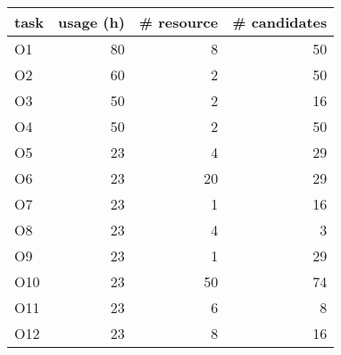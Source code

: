 \begin{tabular}{lrrr}
\toprule
task &  usage (h) &  \# resource &  \# candidates \\
\midrule
  O1 &         80 &           8 &            50 \\
  O2 &         60 &           2 &            50 \\
  O3 &         50 &           2 &            16 \\
  O4 &         50 &           2 &            50 \\
  O5 &         23 &           4 &            29 \\
  O6 &         23 &          20 &            29 \\
  O7 &         23 &           1 &            16 \\
  O8 &         23 &           4 &             3 \\
  O9 &         23 &           1 &            29 \\
 O10 &         23 &          50 &            74 \\
 O11 &         23 &           6 &             8 \\
 O12 &         23 &           8 &            16 \\
\bottomrule
\end{tabular}
